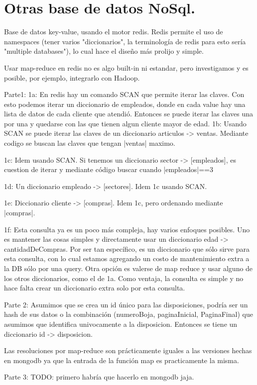 \section{Otras base de datos NoSql.}


Base de datos key-value, usando el motor redis.
Redis permite el uso de namespaces (tener varios "diccionarios", la terminología de redis para esto sería "multiple databases"), lo cual hace el diseño más prolijo y simple.

Usar map-reduce en redis no es algo built-in ni estandar, pero investigamos y es posible, por
    ejemplo, integrarlo con Hadoop.

Parte1:
    1a:
        En redis hay un comando SCAN que permite iterar las claves.
        Con esto podemos iterar un diccionario de empleados, donde en cada
            value hay una lista de datos de cada cliente que atendió.
        Entonces se puede iterar las claves una por una y quedarse con las que
            tienen algun cliente mayor de edad.
    1b:
        Usando SCAN se puede iterar las claves de un diccionario
        articulos -> ventas. Mediante codigo se buscan las claves que tengan
        |ventas| maximo.

    1c:
        Idem usando SCAN. Si tenemos un diccionario sector -> [empleados], es cuestion
            de iterar y mediante código buscar cuando |empleados|==3

    1d:
        Un diccionario empleado -> [sectores]. Idem 1c usando SCAN.

    1e:
        Diccionario cliente  -> [compras]. Idem 1c, pero ordenando mediante |compras|.

    1f:
        Esta consulta ya es un poco más compleja, hay varios enfoques posibles.
        Uno es mantener las cosas simples y directamente usar un diccionario
            edad -> cantidadDeCompras. Por ser tan específico, es un diccionario
            que sólo sirve para esta consulta, con lo cual estamos agregando
            un costo de mantenimiento extra a la DB sólo por una query.
        Otra opción es valerse de map reduce y usar alguno de los otros diccionarios,
            como el de 1a. Como ventaja, la consulta es simple y no hace falta crear un diccionario extra
            solo por esta consulta.


Parte 2:
    Asumimos que se crea un id único para las disposiciones, podría ser un hash de sus datos o
        la combinación (numeroBoja, paginaInicial, PaginaFinal) que asumimos que identifica
        univocamente a la disposicion. Entonces se tiene un diccionario id -> disposicion.

    Las resoluciones por map-reduce son prácticamente iguales a las versiones hechas en mongodb
        ya que la entrada de la función map es practicamente la misma.

Parte 3:
    TODO: primero habría que hacerlo en mongodb jaja.


